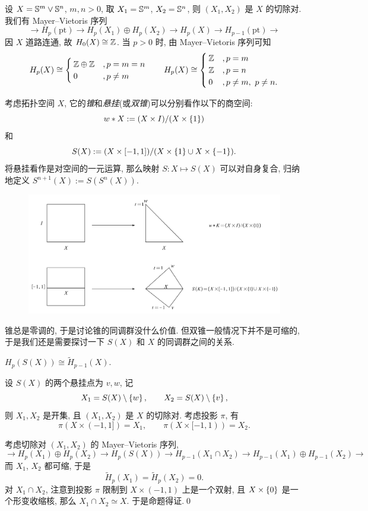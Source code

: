 \begin{Example}[球面的一点并]
	设 $ X=\S^m\vee\S^n $, $ m,n>0 $, 取 $ X_1=\S^m $, $ X_2=\S^n $, 则 $ (X_1,X_2) $ 是 $ X $ 的切除对. 我们有 Mayer--Vietoris 序列
	\[
		\to H_p(\mathrm{pt})\rightarrow H_p(X_1)\oplus H_p(X_2)\rightarrow H_p(X)\rightarrow H_{p-1}(\mathrm{pt})\to
	\]
	因 $ X $ 道路连通, 故 $ H_0(X)\cong\Z $. 当 $ p>0 $ 时, 由 Mayer--Vietoris 序列可知
	\[
		H_p(X)\cong\begin{cases}
			\Z\oplus\Z &,p=m=n \\ 0 &,p\ne m
		\end{cases}\qquad H_p(X)\cong\begin{cases}
			\Z &,p=m \\ \Z &,p=n \\ 0 &,p\ne m,\ p\ne n.
		\end{cases}
	\]
\end{Example}

\begin{Example}[锥和悬挂(双锥)]
	考虑拓扑空间 $ X $, 它的\emph{锥}和\emph{悬挂}(或\emph{双锥})可以分别看作以下的商空间:
	\[
		w*X:=(X\times I)/(X\times\set{1})
	\]
	和
	\[
		S(X):=(X\times[-1,1])/(X\times\set{1}\cup X\times\set{-1}).
	\]
	将悬挂看作是对空间的一元运算, 那么映射 $ S : X\mapsto S(X) $ 可以对自身复合, 归纳地定义 $ S^{n+1}(X):=S(S^n(X)) $.
	\begin{figure}[htbp]
		\centering
		\includegraphics[width=0.85\linewidth]{figures/Sec11-2.png}
	\end{figure}
\end{Example}

锥总是零调的, 于是讨论锥的同调群没什么价值. 但双锥一般情况下并不是可缩的, 于是我们还是需要探讨一下 $ S(X) $ 和 $ X $ 的同调群之间的关系.

\begin{Theorem}
	$ H_p(S(X))\cong\tilde{H}_{p-1}(X) $.
\end{Theorem}
\begin{Proof}
	设 $ S(X) $ 的两个悬挂点为 $ v,w $, 记
	\[
		X_1=S(X)\sm\set{w},\qquad X_2=S(X)\sm\set{v},
	\]
	则 $ X_1,X_2 $ 是开集, 且 $ (X_1,X_2) $ 是 $ X $ 的切除对. 考虑投影 $ \pi $, 有
	\[
		\pi(X\times(-1,1])=X_1,\qquad\pi(X\times[-1,1))=X_2.
	\]

	考虑切除对 $ (X_1,X_2) $ 的 Mayer--Vietoris 序列,
	\[
		\to H_p(X_1)\oplus H_p(X_2)\rightarrow H_p(S(X))\rightarrow H_{p-1}(X_1\cap X_2)\rightarrow H_{p-1}(X_1)\oplus H_{p-1}(X_2)\to
	\]
	而 $ X_1 $, $ X_2 $ 都可缩, 于是
	\[
		\tilde{H}_p(X_1)=\tilde{H}_p(X_2)=0.
	\]
	对 $ X_1\cap X_2 $, 注意到投影 $ \pi $ 限制到 $ X\times(-1,1) $ 上是一个双射, 且 $ X\times\set{0} $ 是一个形变收缩核, 那么 $ X_1\cap X_2\simeq X $. 于是命题得证.\qed
\end{Proof}

